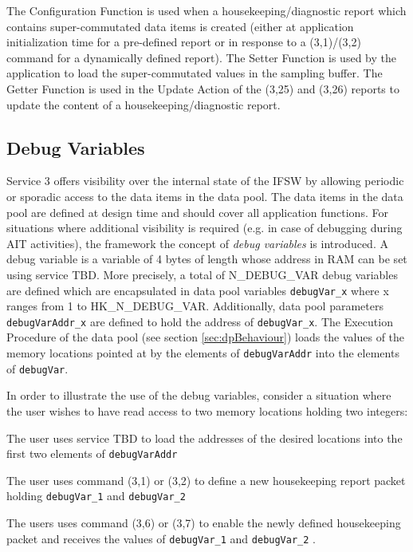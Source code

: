 \documentclass[a4paper,10pt]{article}
\newenvironment{fw_enumerate}					%
{\begin{enumerate}
  \setlength{\itemsep}{1mm}
  \setlength{\parskip}{0pt}
  \setlength{\parsep}{0pt}}
{\end{enumerate}}
\begin{document}
The Configuration Function is used when a housekeeping/diagnostic report which contains super-commutated data items is created (either at application initialization time for a pre-defined report or in response to a (3,1)/(3,2) command for a dynamically defined report). The Setter Function is used by the application to load the super-commutated values in the sampling buffer. The Getter Function is used in the Update Action of the (3,25) and (3,26) reports to update the content of a housekeeping/diagnostic report. 

\subsection{Debug Variables}\label{sec:debugVar}
Service 3 offers visibility over the internal state of the IFSW by allowing periodic or sporadic access to the data items in the data pool. The data items in the data pool are defined at design time and should cover all application functions. For situations where additional visibility is required (e.g. in case of debugging during AIT activities), the framework the concept of \textit{debug variables} is introduced. A debug variable is a variable of 4 bytes of length whose address in RAM can be set using service TBD. More precisely, a total of N\_DEBUG\_VAR debug variables are defined which are encapsulated in data pool variables \texttt{debugVar\_x} where x ranges from 1 to HK\_N\_DEBUG\_VAR. Additionally, data pool parameters \texttt{debugVarAddr\_x} are defined to hold the address of \texttt{debugVar\_x}. The Execution Procedure of the data pool (see section \ref{sec:dpBehaviour}) loads the values of the memory locations pointed at by the elements of \texttt{debugVarAddr} into the elements of \texttt{debugVar}.  

In order to illustrate the use of the debug variables, consider a situation where the user wishes to have read access to two memory locations holding two integers: 

\begin{fw_enumerate}
\item The user uses service TBD to load the addresses of the desired locations into the first two elements of \texttt{debugVarAddr}
\item The user uses command (3,1) or (3,2) to define a new housekeeping report packet holding \texttt{debugVar\_1} and \texttt{debugVar\_2} 
\item The users uses command (3,6) or (3,7) to enable the newly defined housekeeping packet and receives the values of \texttt{debugVar\_1} and \texttt{debugVar\_2} .
\end{fw_enumerate}
\end{document}
